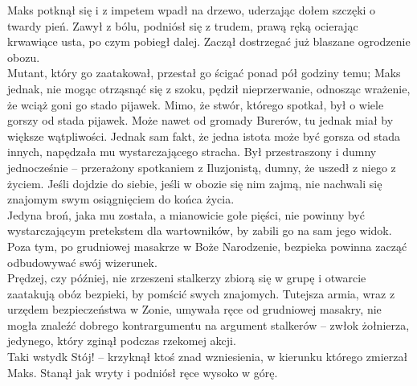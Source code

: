 \documentclass[../MAIN.tex]{subfiles}
\begin{document}
Maks potknął się i z impetem wpadł na drzewo, uderzając dołem szczęki o twardy pień. Zawył z bólu, podniósł się z trudem, prawą ręką ocierając krwawiące usta, po czym pobiegł dalej. Zaczął dostrzegać już blaszane ogrodzenie obozu.\\
Mutant, który go zaatakował, przestał go ścigać ponad pół godziny temu; Maks jednak, nie mogąc otrząsnąć się z szoku, pędził nieprzerwanie, odnosząc wrażenie, że wciąż goni go stado pijawek. Mimo, że stwór, którego spotkał, był o wiele gorszy od stada pijawek. Może nawet od gromady Burerów, tu jednak miał by większe wątpliwości. Jednak sam fakt, że jedna istota może być gorsza od stada innych, napędzała mu wystarczającego stracha. Był przestraszony i dumny jednocześnie -- przerażony spotkaniem z Iluzjonistą, dumny, że uszedł z niego z życiem. Jeśli dojdzie do siebie, jeśli w obozie się nim zajmą, nie nachwali się znajomym swym osiągnięciem do końca życia.\\
Jedyna broń, jaka mu została, a mianowicie gołe pięści, nie powinny być wystarczającym pretekstem dla wartowników, by zabili go na sam jego widok. Poza tym, po grudniowej masakrze w Boże Narodzenie, bezpieka powinna zacząć odbudowywać swój wizerunek.\\
Prędzej, czy później, nie zrzeszeni stalkerzy zbiorą się w grupę i otwarcie zaatakują obóz bezpieki, by pomścić swych znajomych. Tutejsza armia, wraz z urzędem bezpieczeństwa w Zonie, umywała ręce od grudniowej masakry, nie mogła znaleźć dobrego kontrargumentu na argument stalkerów -- zwłok żołnierza, jedynego, który zginął podczas rzekomej akcji.\\
Taki wstyd\3k
\sx Stój! -- krzyknął ktoś znad wzniesienia, w kierunku którego zmierzał Maks.
\qd 
Stanął jak wryty i podniósł ręce wysoko w górę.
\end{document}
